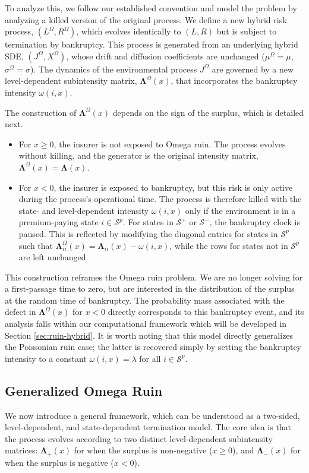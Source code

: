 \documentclass[11pt]{article}
\numberwithin{table}{section}
\numberwithin{figure}{section}
\numberwithin{equation}{section}
\newcommand{\1}{{\mathbf 1}}
\newcommand{\0}{\mat{0}}
\begin{document}
To analyze this, we follow our established convention and model the problem by analyzing a killed version of the original process. We define a new hybrid risk process, \((L^\Omega, R^\Omega)\), which evolves identically to \((L,R)\) but is subject to termination by bankruptcy. This process is generated from an underlying hybrid SDE, \((J^\Omega, X^\Omega)\), whose drift and diffusion coefficients are unchanged (\(\mu^\Omega = \mu\), \(\sigma^\Omega = \sigma\)). The dynamics of the environmental process \(J^\Omega\) are governed by a new level-dependent subintensity matrix, \(\bm{\Lambda}^\Omega(x)\), that incorporates the bankruptcy intensity \(\omega(i,x)\).

The construction of \(\bm{\Lambda}^\Omega(x)\) depends on the sign of the surplus, which is detailed next.
\begin{itemize}
    \item For \(x \ge 0\), the insurer is not exposed to Omega ruin. The process evolves without killing, and the generator is the original intensity matrix, \(\bm{\Lambda}^\Omega(x) = \bm{\Lambda}(x)\).
    \item For \(x < 0\), the insurer is exposed to bankruptcy, but this risk is only active during the process's operational time. The process is therefore killed with the state- and level-dependent intensity \(\omega(i,x)\) only if the environment is in a premium-paying state \(i \in \mathcal{S}^p\). For states in \(\mathcal{S}^+\) or \(\mathcal{S}^-\), the bankruptcy clock is paused. This is reflected by modifying the diagonal entries for states in \(\mathcal{S}^p\) such that \(\bm{\Lambda}^\Omega_{ii}(x) = \bm{\Lambda}_{ii}(x) - \omega(i,x)\), while the rows for states not in \(\mathcal{S}^p\) are left unchanged.
\end{itemize}
This construction reframes the Omega ruin problem. We are no longer solving for a first-passage time to zero, but are interested in the distribution of the surplus at the random time of bankruptcy. The probability mass associated with the defect in \(\bm{\Lambda}^\Omega(x)\) for \(x<0\) directly corresponds to this bankruptcy event, and its analysis falls within our computational framework which will be developed in Section \ref{sec:ruin-hybrid}. It is worth noting that this model directly generalizes the Poissonian ruin case; the latter is recovered simply by setting the bankruptcy intensity to a constant \(\omega(i,x) = \lambda\) for all \(i \in \mathcal{S}^p\).

\subsection{Generalized Omega Ruin}
We now introduce a general framework, which can be understood as a two-sided, level-dependent, and state-dependent termination model. The core idea is that the process evolves according to two distinct level-dependent subintensity matrices: \(\bm{\Lambda}_+(x)\) for when the surplus is non-negative (\(x \ge 0\)), and \(\bm{\Lambda}_-(x)\) for when the surplus is negative (\(x < 0\)).
\end{document}

